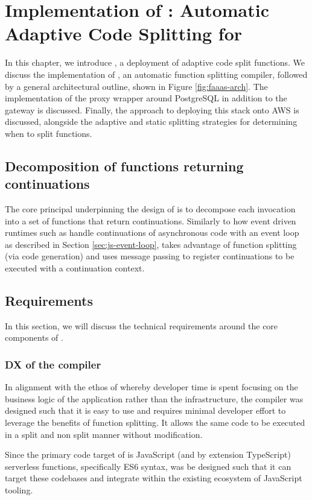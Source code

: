 \chapter{Implementation of \faaas{}: Automatic Adaptive Code Splitting for \faaslong{}}
\label{chap:impl}
In this chapter, we introduce \faaas{}, a deployment of adaptive code split \faas{} functions.
We discuss the implementation of \faaasc{}, an automatic function splitting compiler, followed by a general architectural outline, shown in Figure \ref{fig:faaas-arch}. The implementation of the proxy wrapper around PostgreSQL in addition to the gateway is discussed. Finally, the approach to deploying this stack onto AWS is discussed, alongside the adaptive and static splitting strategies for determining when to split functions.

\section{Decomposition of \faas{} functions returning continuations}
The core principal underpinning the design of \faaas{} is to decompose each \faas{} invocation into a set of functions that return continuations. Similarly to how event driven runtimes such as \js{} handle continuations of asynchronous code with an event loop as described in Section \ref{sec:js-event-loop}, \faaas{} takes advantage of function splitting (via code generation) and uses message passing to register continuations to be executed with a continuation context.

\section{Requirements}
In this section, we will discuss the technical requirements around the core components of \faaas{}.

\cprotect\subsection{DX of the \faaasc{} compiler}
In alignment with the ethos of \faas{} whereby developer time is spent focusing on the business logic of the application rather than the infrastructure, the \faaasc{} compiler was designed such that it is easy to use and requires minimal developer effort to leverage the benefits of function splitting. It allows the same code to be executed in a split and non split manner without modification.

Since the primary code target of \faaasc{} is JavaScript (and by extension TypeScript) serverless functions, specifically ES6 syntax, \faaasc{} was be designed such that it can target these codebases and integrate within the existing ecosystem of JavaScript tooling.

